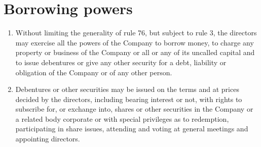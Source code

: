 \section{Borrowing powers}

\begin{enumerate}[label=(\alph*)]
    \item Without limiting the generality of rule 76, but subject to rule 3, the directors may exercise all the powers of the Company to borrow money, to charge any property or business of the Company or all or any of its uncalled capital and to issue debentures or give any other security for a debt, liability or obligation of the Company or of any other person.
    
    \item Debentures or other securities may be issued on the terms and at prices decided by the directors, including bearing interest or not, with rights to subscribe for, or exchange into, shares or other securities in the Company or a related body corporate or with special privileges as to redemption, participating in share issues, attending and voting at general meetings and appointing directors.
\end{enumerate} 